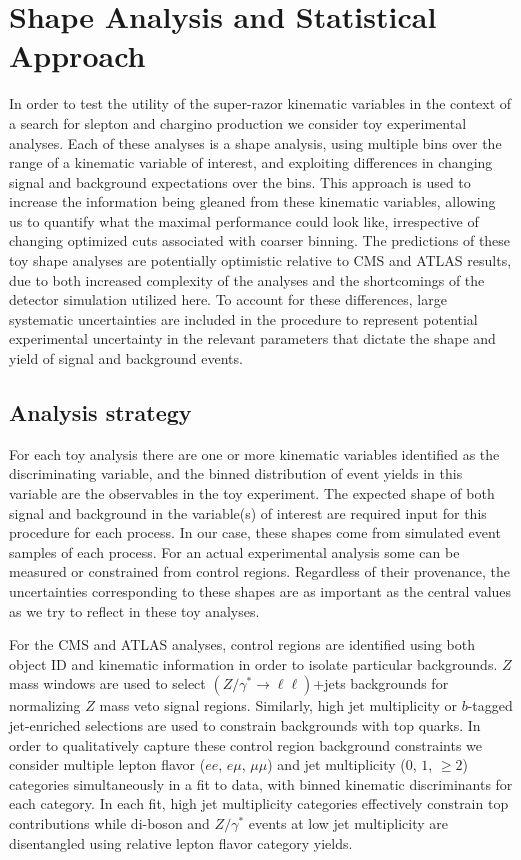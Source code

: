 

\section{Shape Analysis and Statistical Approach \label{sec:shape}}

In order to test the utility of the super-razor kinematic variables in the context of a search for slepton and chargino production we consider toy experimental analyses. Each of these analyses is a shape analysis, using multiple bins over the range of a kinematic variable of interest, and exploiting differences in changing signal and background expectations over the bins. This approach is used to increase the information being gleaned from these kinematic variables, allowing us to quantify what the maximal performance could look like, irrespective of changing optimized cuts associated with coarser binning. The predictions of these toy shape analyses are potentially optimistic relative to CMS and ATLAS results, due to both increased complexity of the analyses and the shortcomings of the detector simulation utilized here. To account for these differences, large systematic uncertainties are included in the procedure to represent potential experimental uncertainty in the relevant parameters that dictate the shape and yield of signal and background events.

\subsection{Analysis strategy}

For each toy analysis there are one or more kinematic variables identified as the discriminating variable, and the binned distribution of event yields in this variable are the observables in the toy experiment. The expected shape of both signal and background in the variable(s) of interest are required input for this procedure for each process. In our case, these shapes come from simulated event samples of each process. For an actual experimental analysis some can be measured or constrained from control regions. Regardless of their provenance, the uncertainties corresponding to these shapes are as important as the central values as we try to reflect in these toy analyses.

For the CMS and ATLAS analyses, control regions are identified using both object ID and kinematic information in order to isolate particular backgrounds. $Z$ mass windows are used to select $(Z/\gamma^*\to \ell\ell)$+jets backgrounds for normalizing $Z$ mass veto signal regions. Similarly, high jet multiplicity or $b$-tagged jet-enriched selections are used to constrain backgrounds with top quarks. In order to qualitatively capture these control region background constraints we consider multiple lepton flavor ($ee$, $e\mu$, $\mu\mu$) and jet multiplicity ($0$, $1$, $\ge 2$) categories simultaneously in a fit to data, with binned kinematic discriminants for each category. In each fit, high jet multiplicity categories effectively constrain top contributions while di-boson and $Z/\gamma^*$ events at low jet multiplicity are disentangled using relative lepton flavor category yields.

